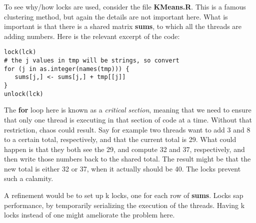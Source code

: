 \documentclass[11pt]{article}
\begin{document}
To see why/how locks are used, consider the file {\bf KMeans.R}.  This
is a famous clustering method, but again the details are not important
here.  What is important is that there is a shared matrix {\bf sums}, to
which all the threads are adding numbers.  Here is the relevant excerpt
of the code:

\begin{lstlisting}
lock(lck)
# the j values in tmp will be strings, so convert
for (j in as.integer(names(tmp))) {
   sums[j,] <- sums[j,] + tmp[[j]]
}
unlock(lck)
\end{lstlisting}

The {\bf for} loop here is known as a {\it critical section}, meaning
that we need to ensure that only one thread is executing in that section
of code at a time.  Without that restriction, chaos could result.  Say
for example two threads want to add 3 and 8 to a certain total,
respectively, and that the current total is 29.  What could happen is
that they both see the 29, and compute 32 and 37, respectively, and then
write those numbers back to the shared total.  The result might be that
the new total is either 32 or 37, when it actually should be 40.  The
locks prevent such a calamity.

A refinement would be to set up k locks, one for each row of {\bf sums}.
Locks sap performance, by temporarily serializing the execution of the
threads.  Having k locks instead of one might ameliorate the problem
here.
\end{document}
